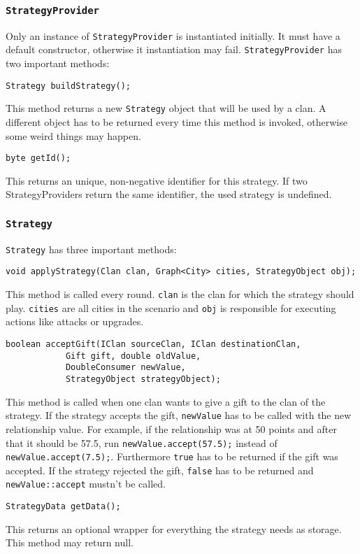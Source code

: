 \documentclass{article}
\begin{document}
\subsubsection{\texttt{StrategyProvider}}
Only an instance of \texttt{StrategyProvider} is instantiated initially. It must have a default constructor, otherwise it instantiation may fail. \texttt{StrategyProvider} has two important methods:
\begin{verbatim}
Strategy buildStrategy();
\end{verbatim}
This method returns a new \texttt{Strategy} object that will be used by a clan. A different object has to be returned every time this method is invoked, otherwise some weird things may happen.
\begin{verbatim}
byte getId();
\end{verbatim}
This returns an unique, non-negative identifier for this strategy. If two StrategyProviders return the same identifier, the used strategy is undefined.
\subsubsection{\texttt{Strategy}}
\texttt{Strategy} has three important methods:
\begin{verbatim}
void applyStrategy(Clan clan, Graph<City> cities, StrategyObject obj);
\end{verbatim}
This method is called every round. \texttt{clan} is the clan for which the strategy should play. \texttt{cities} are all cities in the scenario and  \texttt{obj} is responsible for executing
actions like attacks or upgrades.
\begin{verbatim}
boolean acceptGift(IClan sourceClan, IClan destinationClan,
			Gift gift, double oldValue,
			DoubleConsumer newValue,
			StrategyObject strategyObject);
\end{verbatim}
This method is called when one clan wants to give a gift to the clan of the strategy. If the strategy accepts the gift, \texttt{newValue} has to be called with the new relationship value. For example, if the relationship
was at 50 points and after that it should be 57.5, run \texttt{newValue.accept(57.5);} instead of \texttt{newValue.accept(7.5);}. Furthermore \texttt{true} has to be returned if the gift was accepted.
If the strategy rejected the gift, \texttt{false} has to be returned and \texttt{newValue::accept} mustn't be called.

\begin{verbatim}
StrategyData getData();
\end{verbatim}
This returns an optional wrapper for everything the strategy needs as storage. This method may return null.
\end{document}
